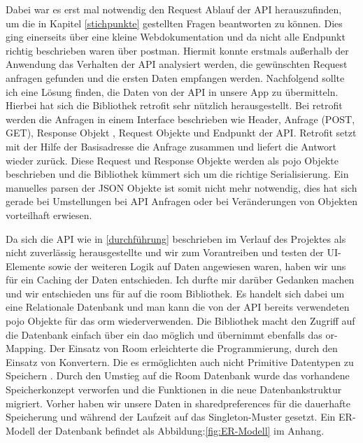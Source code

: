 Dabei war es erst mal notwendig den Request Ablauf der API herauszufinden, um die in Kapitel \ref{stichpunkte} gestellten Fragen beantworten zu können. Dies ging einerseits über eine kleine Webdokumentation und da nicht alle Endpunkt richtig beschrieben
 waren über \gls{postman}. Hiermit konnte erstmals außerhalb der Anwendung das Verhalten der API analysiert werden, die gewünschten Request anfragen gefunden und die ersten Daten empfangen werden. Nachfolgend sollte ich eine Lösung finden, die Daten von der API in unsere App zu übermitteln. Hierbei hat sich die Bibliothek \gls{retrofit} sehr nützlich herausgestellt. Bei \gls{retrofit} werden die Anfragen in einem Interface beschrieben wie Header, Anfrage (POST, GET), Response Objekt , Request
  Objekte und Endpunkt der API. Retrofit setzt mit der Hilfe der Basisadresse die Anfrage zusammen und liefert die Antwort wieder zurück. Diese Request und Response Objekte werden als \ac{pojo} Objekte beschrieben und die Bibliothek kümmert sich um die richtige Serialisierung. Ein manuelles parsen der JSON Objekte ist somit nicht mehr notwendig, dies hat sich gerade bei Umstellungen bei API Anfragen oder bei Veränderungen von Objekten vorteilhaft erwiesen.

Da sich die API wie in \ref{durchführung} beschrieben im Verlauf des Projektes als nicht zuverlässig herausgestellte  und wir zum Vorantreiben und testen der UI-Elemente sowie der weiteren Logik auf Daten angewiesen waren, haben wir uns für ein Caching der Daten entschieden. Ich durfte mir darüber Gedanken machen und wir entschieden uns für  auf die \gls{room} Bibliothek. Es handelt sich dabei um eine Relationale Datenbank und man kann die von der API bereits verwendeten \ac{pojo} Objekte für das \ac{orm} wiederverwenden. Die Bibliothek macht den Zugriff auf die Datenbank einfach über ein \ac{dao}  möglich und übernimmt ebenfalls das \ac{or}-Mapping. Der Einsatz von Room erleichterte die Programmierung, durch den Einsatz von Konvertern. Die es ermöglichten auch nicht Primitive Datentypen zu Speichern . 
Durch den Umstieg auf die Room Datenbank wurde das vorhandene Speicherkonzept verworfen und die Funktionen in die neue Datenbankstruktur migriert.
Vorher haben wir unsere Daten in \gls{sharedpreferences} für die dauerhafte Speicherung und während der Laufzeit auf das Singleton-Muster gesetzt.
Ein ER-Modell der Datenbank befindet als Abbildung:\ref{fig:ER-Modell}  im Anhang.

